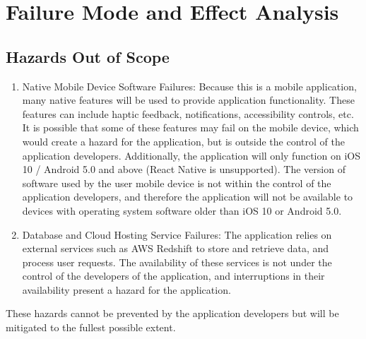 \documentclass{article}
\begin{document}
	\section{Failure Mode and Effect Analysis}
	\subsection{Hazards Out of Scope}
	\begin{enumerate}
		\item Native Mobile Device Software Failures: Because this is a mobile application, many native features will be used to provide application functionality.
		These features can include haptic feedback, notifications, accessibility controls, etc. It is possible that some of these
		features may fail on the mobile device, which would create a hazard for the application, but is outside the control of the application developers. Additionally, the application
		will only function on iOS 10 / Android 5.0 and above (React Native is unsupported). The version of software used by the user mobile device is not within the control of the application developers, and therefore
		the application will not be available to devices with operating system software older than iOS 10 or Android 5.0.
		
		\item Database and Cloud Hosting Service Failures: The application relies on external services such as AWS Redshift to store and retrieve data, and process user requests.
		The availability of these services is not under the control of the developers of the application, and interruptions in their availability present a hazard for the application.
	\end{enumerate}
	These hazards cannot be prevented by the application developers but will be mitigated to the fullest possible extent.
\end{document}

